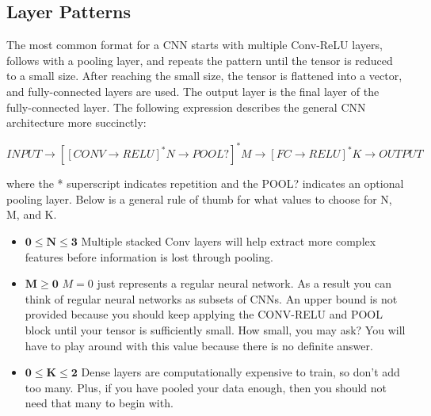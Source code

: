 \documentclass[11pt]{article}
\begin{document}
\subsection{Layer Patterns}
The most common format for a CNN starts with multiple Conv-ReLU layers, follows with a pooling layer, and repeats the pattern until the tensor is reduced to a small size. After reaching the small size, the tensor is flattened into a vector, and fully-connected layers are used. The output layer is the final layer of the fully-connected layer. The following expression describes the general CNN architecture more succinctly: \\
\begin{center}
$INPUT \longrightarrow \left[\left[ CONV \longrightarrow RELU \right]^*N \longrightarrow POOL? \right]^* M \longrightarrow \left[ FC \longrightarrow RELU \right]^*K \longrightarrow OUTPUT $
\end{center}
where the * superscript indicates repetition and the POOL? indicates an optional pooling layer. Below is a general rule of thumb for what values to choose for N, M, and K.
\begin{itemize}
    \item $\mathbf{0 \leq N \leq 3}$ \quad Multiple stacked Conv layers will help extract more complex features before information is lost through pooling.
    \item $\mathbf{M \geq 0}$ \quad $M = 0$ just represents a regular neural network. As a result you can think of regular neural networks as subsets of CNNs. An upper bound is not provided because you should keep applying the CONV-RELU and POOL block until your tensor is sufficiently small. How small, you may ask? You will have to play around with this value because there is no definite answer. 
    \item $\mathbf{0 \leq K \leq 2}$ \quad Dense layers are computationally expensive to train, so don't add too many. Plus, if you have pooled your data enough, then you should not need that many to begin with.
\end{itemize}
\end{document}
